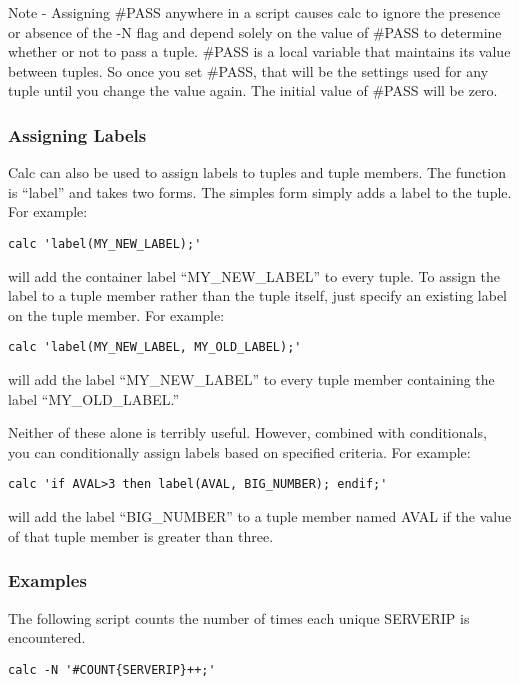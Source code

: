 \documentclass[11pt]{article}
\begin{document}
Note - Assigning \#PASS anywhere in a script causes calc to ignore the presence or absence of the
-N flag and depend solely on the value of \#PASS to determine whether or not to pass a tuple.
\#PASS is a local variable that maintains its value between tuples.  So once you set \#PASS, that will be
the settings used for any tuple until you change the value again.  The initial value of \#PASS will be
zero.


\subsubsection {Assigning Labels}

Calc can also be used to assign labels to tuples and tuple members.
The function is ``label'' and takes two forms.  The simples form
simply adds a label to the tuple.  For example:

\begin{lstlisting}
calc 'label(MY_NEW_LABEL);'
\end{lstlisting}

will add the container label ``MY\_NEW\_LABEL'' to every tuple.  To assign the
label to a tuple member rather than the tuple itself, just specify an
existing label on the tuple member.  For example:

\begin{lstlisting}
calc 'label(MY_NEW_LABEL, MY_OLD_LABEL);'
\end{lstlisting}

will add the label ``MY\_NEW\_LABEL'' to every tuple member containing the label ``MY\_OLD\_LABEL.''

Neither of these alone is terribly useful.  However, combined with conditionals, you can
conditionally assign labels based on specified criteria.  For example:

\begin{lstlisting}
calc 'if AVAL>3 then label(AVAL, BIG_NUMBER); endif;'
\end{lstlisting}

will add the label ``BIG\_NUMBER'' to a tuple member named AVAL if the
value of that tuple member is greater than three.

\subsubsection {Examples}

The following script counts the number of times each unique SERVERIP is encountered.

\begin{lstlisting}
calc -N '#COUNT{SERVERIP}++;'
\end{lstlisting}
\end{document}
